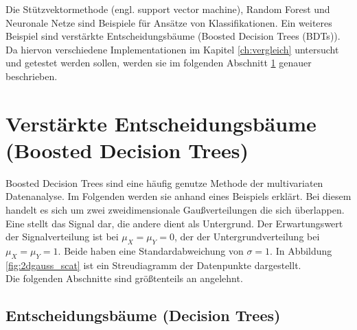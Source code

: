 Die St\"utzvektormethode (engl. support vector machine), Random Forest und Neuronale Netze sind Beispiele f\"ur Ans\"atze von Klassifikationen. 
Ein weiteres Beispiel sind verst\"arkte Entscheidungsb\"aume (Boosted Decision Trees (BDTs)). Da hiervon verschiedene Implementationen im Kapitel \ref{ch:vergleich} untersucht und getestet werden sollen, werden sie im folgenden Abschnitt \ref{ch:Algorithmen:sec:BDT} genauer beschrieben.

\section{Verst\"arkte Entscheidungsb\"aume (Boosted Decision Trees)}
\label{ch:Algorithmen:sec:BDT}

Boosted Decision Trees sind eine h\"aufig genutze Methode der multivariaten Datenanalyse. Im Folgenden werden sie anhand eines Beispiels erkl\"art. Bei diesem handelt es sich um zwei zweidimensionale Gau\ss verteilungen die sich \"uberlappen. Eine stellt das Signal dar, die andere dient als Untergrund. Der Erwartungswert der Signalverteilung ist bei $\mu_X=\mu_Y=0$, der der Untergrundverteilung bei $\mu_X=\mu_Y=1$. Beide haben eine Standardabweichung von $\sigma=1$. In Abbildung \ref{fig:2dgauss_scat} ist ein Streudiagramm der Datenpunkte dargestellt.\\
Die folgenden Abschnitte sind gr\"o\ss tenteils an \cite{SWB-307748006} angelehnt.

\subsection{Entscheidungsb\"aume (Decision Trees)}
\label{ch:Algorithmen:subsec:Entscheidungsbaum}

